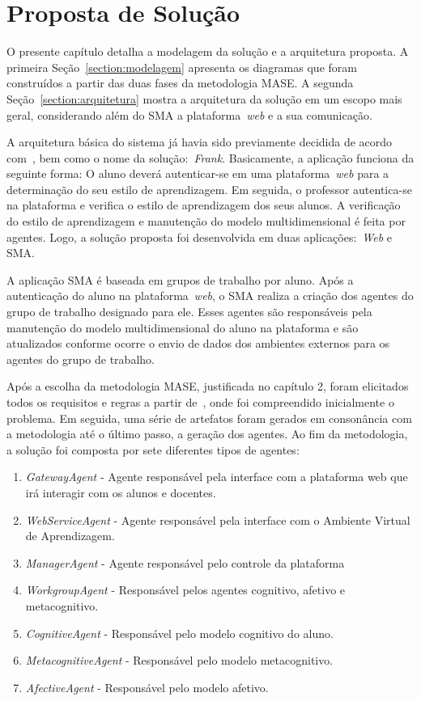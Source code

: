 \chapter{Proposta de Solução}

O presente capítulo detalha a modelagem da solução e a arquitetura proposta. A primeira Seção~\ref{section:modelagem} apresenta os diagramas que foram construídos a partir das duas fases da metodologia MASE. A segunda Seção~\ref{section:arquitetura} mostra a arquitetura da solução em um escopo mais geral, considerando além do SMA a plataforma~\emph{web} e a sua comunicação.

A arquitetura básica do sistema já havia sido previamente decidida de acordo com~\cite{editalFrank}, bem como o nome da solução:~\emph{Frank}. Basicamente, a aplicação funciona da seguinte forma: O aluno deverá autenticar-se em uma plataforma~\emph{web} para a determinação do seu estilo de aprendizagem. Em seguida, o professor autentica-se na plataforma e verifica o estilo de aprendizagem dos seus alunos. A verificação do estilo de aprendizagem e manutenção do modelo multidimensional é feita por agentes. Logo, a solução proposta foi desenvolvida em duas aplicações:~\emph{Web} e SMA.

A aplicação SMA é baseada em grupos de trabalho por aluno. Após a autenticação do aluno na plataforma~\emph{web}, o SMA realiza a criação dos agentes do grupo de trabalho designado para ele. Esses agentes são responsáveis pela manutenção do modelo multidimensional do aluno na plataforma e são atualizados conforme ocorre o envio de dados dos ambientes externos para os agentes do grupo de trabalho.

Após a escolha da metodologia MASE, justificada no capítulo 2, foram elicitados todos os requisitos e regras a partir de~\cite{editalFrank}, onde foi compreendido inicialmente o problema. Em seguida, uma série de artefatos foram gerados em consonância com a metodologia até o último passo, a geração dos agentes. Ao fim da metodologia, a solução foi composta por sete diferentes tipos de agentes:
\begin{enumerate}
	\item \emph{GatewayAgent} - Agente responsável pela interface com a plataforma web que irá interagir com os alunos e docentes.
	\item \emph{WebServiceAgent} - Agente responsável pela interface com o Ambiente Virtual de Aprendizagem.
	\item \emph{ManagerAgent} - Agente responsável pelo controle da plataforma
	\item \emph{WorkgroupAgent} - Responsável pelos agentes cognitivo, afetivo e metacognitivo.
	\item \emph{CognitiveAgent} - Responsável pelo modelo cognitivo do aluno.
	\item \emph{MetacognitiveAgent} - Responsável pelo modelo metacognitivo.
	\item \emph{AfectiveAgent} - Responsável pelo modelo afetivo.
\end{enumerate}


